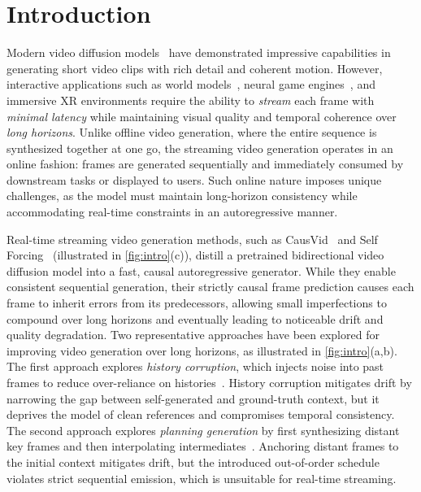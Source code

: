 \section{Introduction}



Modern video diffusion models~\citep{openai_sora, polyak2024movie} have demonstrated impressive capabilities in generating short video clips with rich detail and coherent motion.
% 
However, interactive applications such as world models~\citep{bruce2024genie}, neural game engines~\citep{valevski2024diffusion}, and immersive XR environments require the ability to \emph{stream} each frame with \emph{minimal latency} while maintaining visual quality and temporal coherence over \emph{long horizons}.
% 
Unlike offline video generation, where the entire sequence is synthesized together at one go, the streaming video generation operates in an online fashion: frames are generated sequentially and immediately consumed by downstream tasks or displayed to users.
%
Such online nature imposes unique challenges, as the model must maintain long-horizon consistency while accommodating real-time constraints in an autoregressive manner.



Real-time streaming video generation methods, such as CausVid~\citep{yin2025slow} and Self Forcing~\citep{huang2025self} (illustrated in \cref{fig:intro}(c)), distill a pretrained bidirectional video diffusion model into a fast, causal autoregressive generator. While they enable consistent sequential generation, their strictly causal frame prediction causes each frame to inherit errors from its predecessors, allowing small imperfections to compound over long horizons and eventually leading to noticeable drift and quality degradation.
%
Two representative approaches have been explored for improving video generation over long horizons, as illustrated in \cref{fig:intro}(a,b). The first approach explores \emph{history corruption}, which injects noise into past frames to reduce over-reliance on histories~\citep{chen2024diffusion, guo2025long}. History corruption mitigates drift by narrowing the gap between self-generated and ground-truth context, but it deprives the model of clean references and compromises temporal consistency. The second approach explores \emph{planning generation} by first synthesizing distant key frames and then interpolating intermediates~\citep{zhang2025packing, xiang2025macro}. Anchoring distant frames to the initial context mitigates drift, but the introduced out-of-order schedule violates strict sequential emission, which is unsuitable for real-time streaming.





